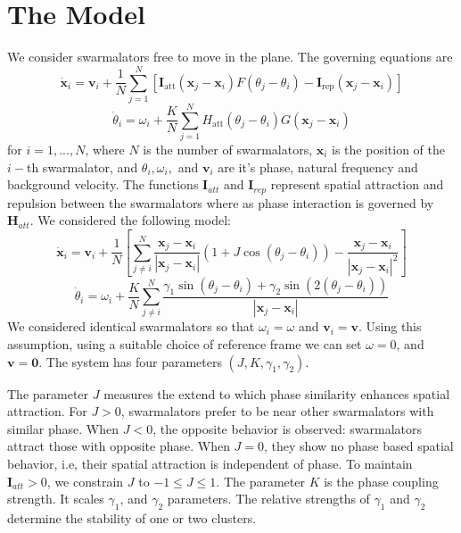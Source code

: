 \documentclass[twocolumn,10pt]{asme2ej}
\begin{document}
\section{The Model}
We consider swarmalators free to move in the plane. The governing equations are \noindent
\begin{equation}
    \dot{\mathbf{x}}_{i}=\mathbf{v}_{i}+\frac{1}{N} \sum_{j=1}^{N}\left[\mathbf{I}_{\mathrm{att}}\left(\mathbf{x}_{j}-\mathbf{x}_{i}\right) F\left(\theta_{j}-\theta_{i}\right)-\mathbf{I}_{\mathrm{rep}}\left(\mathbf{x}_{j}-\mathbf{x}_{i}\right)\right]
\end{equation}
\begin{equation}
    \dot{\theta}_{i}=\omega_{i}+\frac{K}{N} \sum_{j=1}^{N} H_{\mathrm{att}}\left(\theta_{j}-\theta_{i}\right) G\left(\mathbf{x}_{j}-\mathbf{x}_{i}\right)
\end{equation}
for $i = 1,...,N$, where $N$ is the number of swarmalators, $\mathbf{x}_{i} $ is the position of the $i-$th swarmalator, and $\theta_i,\omega_i,$ and $\mathbf{v}_i$ are it's phase, natural frequency and background velocity. The functions $\mathbf{I}_{att}$ and $\mathbf{I}_{rep}$ represent spatial attraction and repulsion between the swarmalators where as phase interaction is governed by $\mathbf{H}_{att}$. We considered the following model:
\begin{equation}
    \dot{\mathbf{x}}_{i}=\mathbf{v}_{i}+\frac{1}{N}\left[\sum_{j \neq i}^{N} \frac{\mathbf{x}_{j}-\mathbf{x}_{i}}{\left|\mathbf{x}_{j}-\mathbf{x}_{i}\right|}\left(1+J \cos \left(\theta_{j}-\theta_{i}\right)\right)-\frac{\mathbf{x}_{j}-\mathbf{x}_{i}}{\left|\mathbf{x}_{j}-\mathbf{x}_{i}\right|^{2}}\right]
\end{equation}
\begin{equation}
    \dot{\theta}_{i}=\omega_{i}+\frac{K}{N} \sum_{j \neq i}^{N} \frac{\gamma_1 \sin \left(\theta_{j}-\theta_{i}\right) + \gamma_2 \sin \left(2 \left(\theta_j - \theta_i\right)\right) }{\left|\mathbf{x}_{j}-\mathbf{x}_{i}\right|}
\end{equation}
We considered identical swarmalators so that $\omega_i = \omega$ and $\mathbf{v}_i = \mathbf{v}$. Using this assumption, using a suitable choice of reference frame we can set $\omega = 0$, and $\mathbf{v} = \mathbf{0}$. The system has four parameters $\left(J,K,\gamma_1,\gamma_2\right )$. 

The parameter $J$ measures the extend to which phase similarity enhances spatial attraction. For $J>0$, swarmalators prefer to be near other swarmalators with similar phase. When $J<0$, the opposite behavior is observed: swarmalators attract those with opposite phase. When $J=0$, they show no phase based spatial behavior, i.e, their spatial attraction is independent of phase. To maintain $\mathbf{I}_{att} > 0$, we constrain $J$ to $-1 \leq J \leq 1$. The parameter $K$ is the phase coupling strength. It scales $\gamma_1$, and $\gamma_2$ parameters. The relative strengths of $\gamma_1$ and $\gamma_2$ determine the stability of one or two clusters. \noindent
\end{document}
